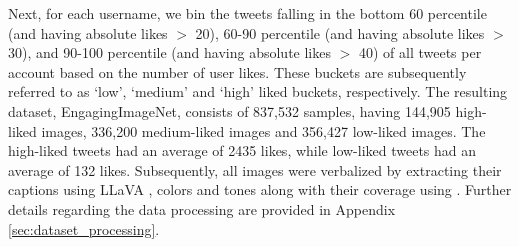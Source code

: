 \begin{table}[!tp]\centering
\caption{A comparison of datasets containing image preferences}\label{tab:image_preference_datasets}
\end{table}
 
 Next, for each username, we bin the tweets falling in the bottom 60 percentile (and having absolute likes $>$ 20), 60-90 percentile (and having absolute likes $>$ 30), and 90-100 percentile (and having absolute likes $>$ 40) of all tweets per account based on the number of user likes. These buckets are subsequently referred to as `low', `medium' and `high' liked buckets, respectively. %
 The resulting dataset, EngagingImageNet, consists of 837,532 samples, having 144,905 high-liked images, 336,200 medium-liked images and 356,427 low-liked images. The high-liked tweets had an average of 2435 likes, while low-liked tweets had an average of 132 likes. 
 Subsequently, all images were verbalized by extracting their captions using LLaVA \cite{liu2023visual}, colors and tones along with their coverage using \cite{Qin_2020_PR}. 
Further details regarding the data processing are provided in Appendix \ref{sec:dataset_processing}.

